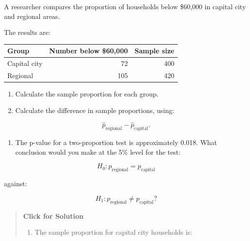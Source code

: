\documentclass[
  letterpaper,
  DIV=11,
  numbers=noendperiod]{scrreprt}
\newcounter{none} %
\providecommand{\tightlist}{%
  \setlength{\itemsep}{0pt}\setlength{\parskip}{0pt}}
\begin{document}
\begin{tcolorbox}[enhanced jigsaw, arc=.35mm, bottomrule=.15mm, bottomtitle=1mm, breakable, colback=white, colbacktitle=quarto-callout-note-color!10!white, colframe=quarto-callout-note-color-frame, coltitle=black, left=2mm, leftrule=.75mm, opacityback=0, opacitybacktitle=0.6, rightrule=.15mm, title=\textcolor{quarto-callout-note-color}{\faInfo}\hspace{0.5em}{Question 11}, titlerule=0mm, toprule=.15mm, toptitle=1mm]

A researcher compares the proportion of households below \$60,000 in
capital city and regional areas.

The results are:

{\def\LTcaptype{none} %
\begin{longtable}[]{@{}lrr@{}}
\toprule\noalign{}
Group & Number below \$60,000 & Sample size \\
\midrule\noalign{}
\endhead
\bottomrule\noalign{}
\endlastfoot
Capital city & 72 & 400 \\
Regional & 105 & 420 \\
\end{longtable}
}

\begin{enumerate}
\def\labelenumi{\alph{enumi}.}
\tightlist
\item
  Calculate the sample proportion for each group.\\
\item
  Calculate the difference in sample proportions, using:
\end{enumerate}

\[
\hat{p}_{\text{regional}} - \hat{p}_{\text{capital}}.
\]

\begin{enumerate}
\def\labelenumi{\alph{enumi}.}
\setcounter{enumi}{2}
\tightlist
\item
  The p-value for a two-proportion test is approximately 0.018. What
  conclusion would you make at the 5\% level for the test:
\end{enumerate}

\[
H_0: p_{\text{regional}} = p_{\text{capital}}
\]

against:

\[
H_1: p_{\text{regional}} \neq p_{\text{capital}}?
\]

\begin{quote}
\textbf{Click for Solution}

\begin{enumerate}
\def\labelenumi{\alph{enumi}.}
\tightlist
\item
  The sample proportion for capital city households is:
\end{enumerate}


\end{quote}
\end{tcolorbox}
\end{document}
